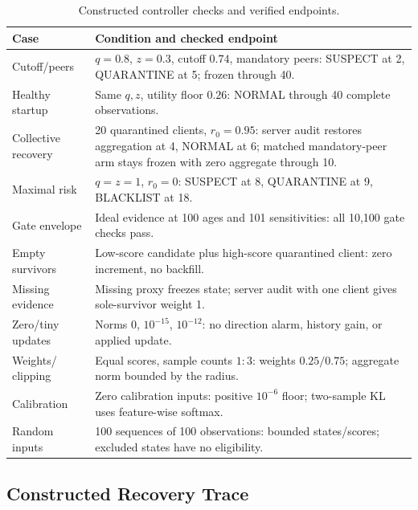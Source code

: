 \documentclass[conference,compsoc]{IEEEtran}
\begin{document}
\begin{table}[!htb]
    \centering
    \caption{Constructed controller checks and verified endpoints.}
    \label{tab:verification}
    \footnotesize
    \setlength{\tabcolsep}{3pt}
    \begin{tabular}{@{}p{1.75cm}p{6.2cm}@{}}
        \toprule
        Case & Condition and checked endpoint \\
        \midrule
        Cutoff/peers & $q=0.8$, $z=0.3$, cutoff $0.74$,
        mandatory peers: SUSPECT at 2, QUARANTINE at 5; frozen through 40. \\
        Healthy startup & Same $q,z$, utility floor $0.26$: NORMAL through 40
        complete observations. \\
        Collective recovery & 20 quarantined clients, $r_0=0.95$: server audit
        restores aggregation at 4, NORMAL at 6; matched mandatory-peer arm
        stays frozen with zero aggregate through 10. \\
        Maximal risk & $q=z=1$, $r_0=0$: SUSPECT at 8, QUARANTINE at 9,
        BLACKLIST at 18. \\
        Gate envelope & Ideal evidence at 100 ages and 101 sensitivities:
        all 10,100 gate checks pass. \\
        Empty survivors & Low-score candidate plus high-score quarantined
        client: zero increment, no backfill. \\
        Missing evidence & Missing proxy freezes state; server audit with
        one client gives sole-survivor weight 1. \\
        Zero/tiny updates & Norms $0$, $10^{-15}$, $10^{-12}$: no direction
        alarm, history gain, or applied update. \\
        Weights/ clipping & Equal scores, sample counts $1:3$: weights
        $0.25/0.75$; aggregate norm bounded by the radius. \\
        Calibration & Zero calibration inputs: positive
        $10^{-6}$ floor; two-sample KL uses feature-wise softmax. \\
        Random inputs & 100 sequences of 100 observations:
        bounded states/scores; excluded states have no eligibility. \\
        \bottomrule
    \end{tabular}
\end{table}

\subsection{Constructed Recovery Trace}
\end{document}

